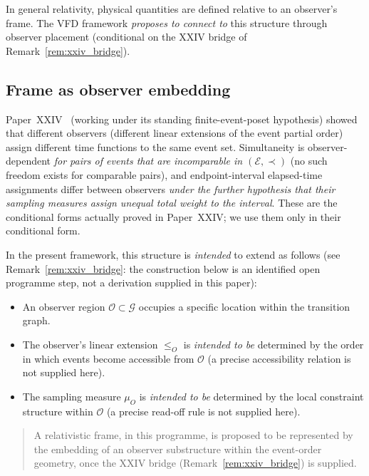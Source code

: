 \documentclass[12pt]{article}
\newcommand{\Ecal}{\mathcal{E}}
\newcommand{\Gcal}{\mathcal{G}}
\newcommand{\Ocal}{\mathcal{O}}
\begin{document}
In general relativity, physical quantities are defined relative to an observer's frame. The VFD framework \emph{proposes to connect to} this structure through observer placement (conditional on the XXIV bridge of Remark~\ref{rem:xxiv_bridge}).

\subsection{Frame as observer embedding}

Paper~XXIV~\citep{SmartXXIV} (working under its standing finite-event-poset hypothesis) showed that different observers (different linear extensions of the event partial order) assign different time functions to the same event set. Simultaneity is observer-dependent \emph{for pairs of events that are incomparable in $(\Ecal, \prec)$} (no such freedom exists for comparable pairs), and endpoint-interval elapsed-time assignments differ between observers \emph{under the further hypothesis that their sampling measures assign unequal total weight to the interval}. These are the conditional forms actually proved in Paper~XXIV; we use them only in their conditional form.

In the present framework, this structure is \emph{intended} to extend as follows (see Remark~\ref{rem:xxiv_bridge}: the construction below is an identified open programme step, not a derivation supplied in this paper):

\begin{itemize}
    \item An observer region $\Ocal \subset \Gcal$ occupies a specific location within the transition graph.
    \item The observer's linear extension $\leq_O$ is \emph{intended to be} determined by the order in which events become accessible from $\Ocal$ (a precise accessibility relation is not supplied here).
    \item The sampling measure $\mu_O$ is \emph{intended to be} determined by the local constraint structure within $\Ocal$ (a precise read-off rule is not supplied here).
\end{itemize}

\begin{quote}
A relativistic frame, in this programme, is proposed to be represented by the embedding of an observer substructure within the event-order geometry, once the XXIV bridge (Remark~\ref{rem:xxiv_bridge}) is supplied.
\end{quote}
\end{document}
